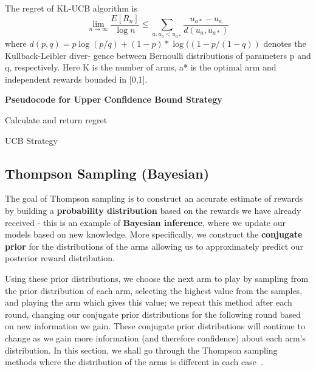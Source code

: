 The regret of KL-UCB algorithm is \[\lim_{n\to \infty} \frac{E[R_n]}{\log n} \leq  \sum_{a:u_a < u_{a*}} \frac{u_{a*}-u_a}{d(u_a,u_{a*})}  \]
where $d(p, q) = p \log(p/q) + (1 - p) * \log((1 - p/(1 - q))$ denotes the Kullback-Leibler diver- gence between Bernoulli distributions of parameters p and q, respectively.
Here K is the number of arms, a* is the optimal arm and independent rewards bounded in [0,1].\citep{Garivier2011}
\par
\textbf{Pseudocode for Upper Confidence Bound Strategy}
\newline
\begin{algorithm}[H]
        Calculate and return regret
        \caption{UCB Strategy}\label{alg:ucb_algorithm}
    \end{algorithm}

\subsection{Thompson Sampling (Bayesian)}\label{subsec:thompson-sampling-(bayesian)}
The goal of Thompson sampling is to construct an accurate estimate of rewards by building a \textbf{probability distribution} based on the rewards we have already received - this is an example of \textbf{Bayesian inference}, where we update our models based on new knowledge.
More specifically, we construct the \textbf{conjugate prior} for the distributions of the arms allowing us to approximately predict our posterior reward distribution.

Using these prior distributions, we choose the next arm to play by sampling from the prior distribution of each arm, selecting the highest value from the samples, and playing the arm which gives this value;
we repeat this method after each round, changing our conjugate prior distributions for the following round based on new information we gain.
These conjugate prior distributions will continue to change as we gain more information (and therefore confidence) about each arm's distribution.
In this section, we shall go through the Thompson sampling methods where the distribution of the arms is different in each case~\citep{agrawal2012analysis}.

